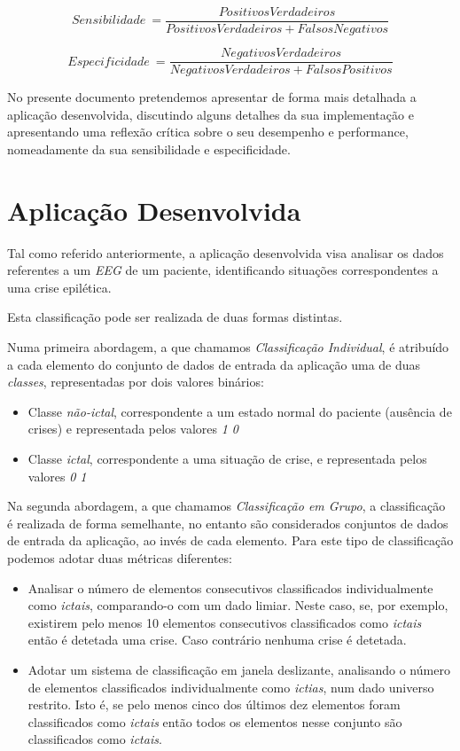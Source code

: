 \documentclass{article}
\begin{document}
$$Sensibilidade \: = \frac{PositivosVerdadeiros}{PositivosVerdadeiros + FalsosNegativos}$$

$$Especificidade \: = \frac{NegativosVerdadeiros}{NegativosVerdadeiros + FalsosPositivos}$$

\vspace{.1cm}

No presente documento pretendemos apresentar de forma mais detalhada a aplicação desenvolvida, discutindo alguns detalhes da sua implementação e apresentando uma reflexão crítica sobre o seu desempenho e performance, nomeadamente da sua sensibilidade e especificidade.

\pagebreak

\section{Aplicação Desenvolvida}

Tal como referido anteriormente, a aplicação desenvolvida visa analisar os dados referentes a um \emph{EEG} de um paciente, identificando situações correspondentes a uma crise epilética.

Esta classificação pode ser realizada de duas formas distintas.

Numa primeira abordagem, a que chamamos \emph{Classificação Individual}, é atribuído a cada elemento do conjunto de dados de entrada da aplicação uma de duas \emph{classes}, representadas por dois valores binários:

\begin{itemize}
\item Classe \emph{não-ictal}, correspondente a um estado normal do paciente (ausência de crises) e representada pelos valores \emph{1 0}

\item Classe \emph{ictal}, correspondente a uma situação de crise, e representada pelos valores \emph{0 1}
\end{itemize}

Na segunda abordagem, a que chamamos \emph{Classificação em Grupo}, a classificação é realizada de forma semelhante, no entanto são considerados conjuntos de dados de entrada da aplicação, ao invés de cada elemento. Para este tipo de classificação podemos adotar duas métricas diferentes:

\begin{itemize}
\item Analisar o número de elementos consecutivos classificados individualmente como \emph{ictais}, comparando-o com um dado limiar. Neste caso, se, por exemplo, existirem pelo menos 10 elementos consecutivos classificados como \emph{ictais} então é detetada uma crise. Caso contrário nenhuma crise é detetada.

\item Adotar um sistema de classificação em janela deslizante, analisando o número de elementos classificados individualmente como \emph{ictias}, num dado universo restrito. Isto é, se pelo menos cinco dos últimos dez elementos foram classificados como \emph{ictais} então todos os elementos nesse conjunto são classificados como \emph{ictais}.
\end{itemize}
\end{document}
